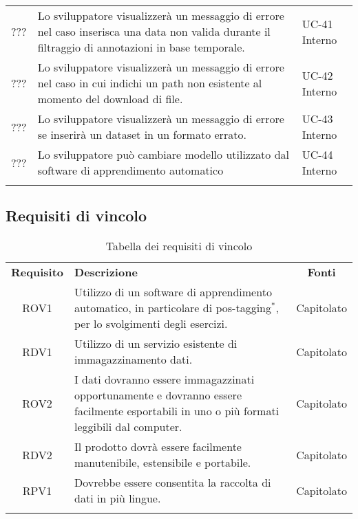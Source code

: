 \begin{tabularx}{\textwidth}{| c | p{10cm} | X |}
		??? & Lo sviluppatore visualizzerà un messaggio di errore nel caso inserisca una data non valida durante il filtraggio di annotazioni in base temporale. & UC-41 \newline Interno\\
		??? & Lo sviluppatore visualizzerà un messaggio di errore nel caso in cui indichi un path non esistente al momento del download di file. & UC-42 \newline Interno\\
		??? & Lo sviluppatore visualizzerà un messaggio di errore se inserirà un dataset in un formato errato. & UC-43 \newline Interno\\
		??? & Lo sviluppatore può cambiare modello utilizzato dal software di apprendimento automatico & UC-44 \newline Interno\\
		\hline
		\caption{Tabella dei requisiti funzionali}
\end{tabularx}

\subsection{Requisiti di vincolo}
\begin{longtable}{| c | p{10cm} | c |}
		\rowcolor{LightBlue}
		\color{white}\bfseries Requisito & \color{white}\bfseries Descrizione & \color{white}\bfseries Fonti\\[0.25cm]
		ROV1 & Utilizzo di un software di apprendimento automatico, in particolare di pos-tagging$^*$, per lo svolgimenti degli esercizi. & Capitolato \\
		RDV1 & Utilizzo di un servizio esistente di immagazzinamento dati. & Capitolato \\
		ROV2 & I dati dovranno essere immagazzinati opportunamente e dovranno essere facilmente esportabili in uno o più formati leggibili dal computer. & Capitolato \\
		RDV2 & Il prodotto dovrà essere facilmente manutenibile, estensibile e portabile. & Capitolato \\
		RPV1 & Dovrebbe essere consentita la raccolta di dati in più lingue. & Capitolato \\ \hline
		\caption{Tabella dei requisiti di vincolo}
\end{longtable}

